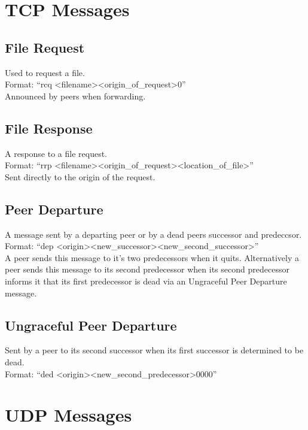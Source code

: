 \documentclass[a4paper]{article}
\begin{document}
\section{TCP Messages}

\subsection{File Request}
Used to request a file. \\
Format: ``rcq \textless filename\textgreater  \textless origin\_of\_request\textgreater  0''\\

Announced by peers when forwarding.

\subsection{File Response}
A response to a file request. \\
Format: ``rrp \textless filename\textgreater  \textless origin\_of\_request\textgreater  \textless location\_of\_file\textgreater '' \\

Sent directly to the origin of the request.

\subsection{Peer Departure}
A message sent by a departing peer or by a dead peers successor and predeccsor. \\
Format: ``dep \textless origin\textgreater  \textless new\_successor\textgreater  \textless new\_second\_successor\textgreater '' \\

A peer sends this message to it's two predecessors when it quits. Alternatively a peer sends this message to its second predecessor when its second predecessor informs it that its first predecessor is dead via an Ungraceful Peer Departure message.

\subsection{Ungraceful Peer Departure}
Sent by a peer to its second successor when its first successor is determined to be dead.\\
Format: ``ded \textless origin\textgreater  \textless new\_second\_predecessor\textgreater  0000''


\section{UDP Messages}
\end{document}
